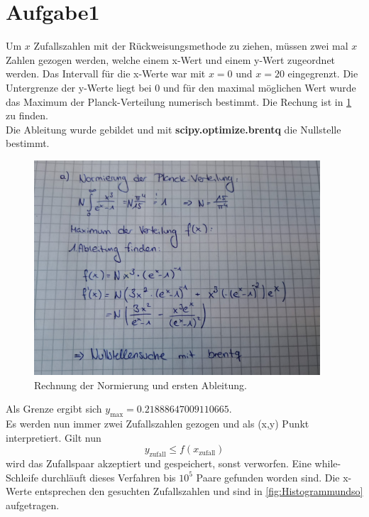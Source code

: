 \section{Aufgabe1}
\label{sec:Aufgabe1}
%
Um $x$ Zufallszahlen mit der Rückweisungsmethode zu ziehen, müssen zwei mal $x$ Zahlen
gezogen werden, welche einem x-Wert und einem y-Wert zugeordnet werden.
Das Intervall für die x-Werte war mit $x=0$ und $x=20$ eingegrenzt. Die Untergrenze
der y-Werte liegt bei $0$ und für den maximal möglichen Wert wurde das Maximum der
Planck-Verteilung numerisch bestimmt. Die Rechung ist in \ref{fig:Rechnung} zu finden.\\
Die Ableitung wurde gebildet und mit \textbf{scipy.optimize.brentq} die Nullstelle bestimmt.\\
\begin{figure}
  \centering
  \includegraphics[height = 8cm]{pics/Rechnung1a.jpeg}
  \caption{Rechnung der Normierung und ersten Ableitung.}
  \label{fig:Rechnung}
\end{figure}
Als Grenze ergibt sich $y_{\text{max}} = 0.21888647009110665$. \\
Es werden nun immer zwei Zufallszahlen gezogen und als (x,y) Punkt interpretiert.
Gilt nun
\begin{equation*}
  y_{\text{zufall}}\leq f(x_{\text{zufall}})
\end{equation*}
wird das Zufallspaar akzeptiert und gespeichert, sonst verworfen. Eine while-Schleife
durchläuft dieses Verfahren bis $10^5$ Paare gefunden worden sind. Die x-Werte entsprechen den
gesuchten Zufallszahlen und sind in \ref{fig:Histogrammundso} aufgetragen.
